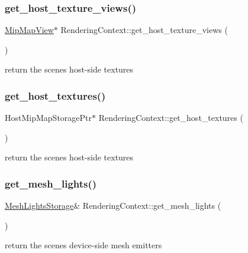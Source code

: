 \subsubsection{\texorpdfstring{get\+\_\+host\+\_\+texture\+\_\+views()}{get\_host\_texture\_views()}}
{\footnotesize\ttfamily \hyperlink{struct_mip_map_view}{Mip\+Map\+View}$\ast$ Rendering\+Context\+::get\+\_\+host\+\_\+texture\+\_\+views (\begin{DoxyParamCaption}{ }\end{DoxyParamCaption})}

return the scene\textquotesingle{}s host-\/side textures \mbox{\label{struct_rendering_context_a2872584d3e982052abf7317f48298bda}} 
\subsubsection{\texorpdfstring{get\+\_\+host\+\_\+textures()}{get\_host\_textures()}}
{\footnotesize\ttfamily Host\+Mip\+Map\+Storage\+Ptr$\ast$ Rendering\+Context\+::get\+\_\+host\+\_\+textures (\begin{DoxyParamCaption}{ }\end{DoxyParamCaption})}

return the scene\textquotesingle{}s host-\/side textures \mbox{\label{struct_rendering_context_a076d2a2c86696da228fc6a49d55910ee}} 
\subsubsection{\texorpdfstring{get\+\_\+mesh\+\_\+lights()}{get\_mesh\_lights()}}
{\footnotesize\ttfamily \hyperlink{struct_mesh_lights_storage}{Mesh\+Lights\+Storage}\& Rendering\+Context\+::get\+\_\+mesh\+\_\+lights (\begin{DoxyParamCaption}{ }\end{DoxyParamCaption})}

return the scene\textquotesingle{}s device-\/side mesh emitters \mbox{\label{struct_rendering_context_a731fbdfe11c00c21e3ee44c025bfcf9a}} 
